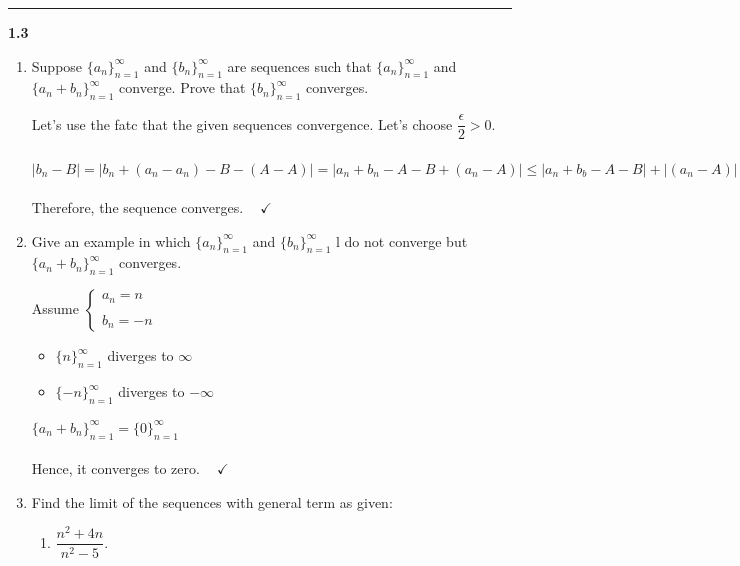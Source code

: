 \documentclass[fleqn]{article}
\begin{document}
  \rule{15cm}{2pt}

  \textbf{1.3}
  \begin{enumerate}
    \item Suppose $\{a_n\}_{n=1}^{\infty}$ and $\{b_n\}_{n=1}^{\infty}$ are sequences such that $\{a_n\}_{n=1}^{\infty}$
    and $\{a_n+b_n\}_{n=1}^{\infty}$ converge. Prove that $\{b_n\}_{n=1}^{\infty}$ converges.

      \textcolor{hwColor}{
        Let's use the fatc that the given sequences convergence. Let's choose $\dfrac{\epsilon}{2}>0$. 
        \\
        \\
        $
          |b_n-B|=|b_n+\left(a_n-a_n\right)-B-(A-A)|=|a_n+b_n-A-B+(a_n-A)| \leq |a_n+b_b-A-B|+|(a_n-A)| < \epsilon
        $
        \\
        \\
        Therefore, the sequence converges. $ ~~~~ \checkmark$
      }

    \item Give an example in which $\{a_n\}_{n=1}^{\infty}$ and $\{b_n\}_{n=1}^{\infty}$ l do not converge but 
    $\{a_n+b_n\}_{n=1}^{\infty}$ converges.

      \textcolor{hwColor}{
        Assume $\begin{cases}
          a_n=n 
          \\
          \\
          b_n=-n
        \end{cases}$
        \\
        \begin{itemize}
          \item $\{n\}_{n=1}^{\infty}$ diverges to $\infty$
          \item $\{-n\}_{n=1}^{\infty}$ diverges to $-\infty$
        \end{itemize}
      }

      \textcolor{hwColor}{
        $
          \{a_n+b_n\}_{n=1}^{\infty}=\{0\}_{n=1}^{\infty}
        $
        \\
        \\
        Hence, it converges to zero. $ ~~~~ \checkmark$
      }



    \item Find the limit of the sequences with general term as given:
    \begin{enumerate}
      \item $\dfrac{n^2+4n}{n^2-5}$.
      

\end{enumerate}
\end{enumerate}
\end{document}
